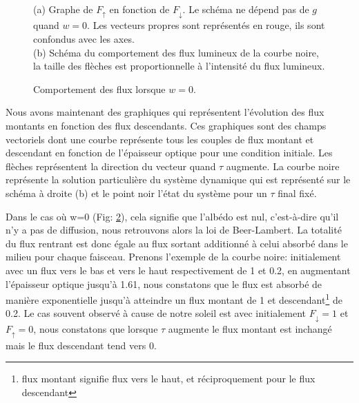 \documentclass[12pt]{article}
\begin{document}
\begin{figure}[H]
\begin{subfigure}{0.3\textwidth}
        \caption{} 
        \label{fig:Sub_Schema_W=0}
    \end{subfigure}
    \caption{Comportement des flux lorsque $w=0$.} 
    \label{fig:W=0}
    \justifying \noindent
    (a) Graphe de $F_{\uparrow}$ en fonction de $F_{\downarrow}$. Le schéma ne dépend pas de $g$ quand $w=0$. Les vecteurs propres sont représentés en rouge, ils sont confondus avec les axes.\\ (b) Schéma du comportement des flux lumineux de la courbe noire, la taille des flèches est proportionnelle à l'intensité du flux lumineux.
\end{figure} %
\par 
Nous avons maintenant des graphiques qui représentent l'évolution des flux montants en fonction des flux descendants. Ces graphiques sont des champs vectoriels dont une courbe représente tous les couples de flux montant et descendant en fonction de l'épaisseur optique pour une condition initiale. Les flèches représentent la direction du vecteur quand $\tau$ augmente. La courbe noire représente la solution particulière du système dynamique qui est représenté sur le schéma à droite (b) et le point noir l'état du système pour un $\tau$ final fixé. 

Dans le cas où w=0 (Fig: \ref{fig:W=0}), cela signifie que l'albédo est nul, c'est-à-dire qu'il n'y a pas de diffusion, nous retrouvons alors la loi de Beer-Lambert. La totalité du flux rentrant est donc égale au flux sortant additionné à celui absorbé dans le milieu pour chaque faisceau.
Prenons l'exemple de la courbe noire: initialement avec un flux vers le bas et vers le haut respectivement de 1 et 0.2, en augmentant l'épaisseur optique jusqu'à 1.61, nous constatons que le flux est absorbé de manière exponentielle jusqu'à atteindre un flux montant de 1 et descendant\footnote{flux montant signifie flux vers le haut, et réciproquement pour le flux descendant} de 0.2.
Le cas souvent observé à cause de notre soleil est avec initialement $F_{\downarrow}=1$ et $F_{\uparrow}=0$, nous constatons que lorsque $\tau$ augmente le flux montant est inchangé mais le flux descendant tend vers 0.
\end{document}

